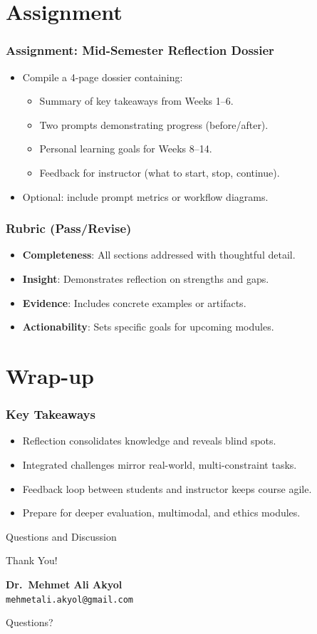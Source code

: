 \documentclass{beamer}
\begin{document}
\section{Assignment}

\begin{frame}
    \frametitle{Assignment: Mid-Semester Reflection Dossier}
    \begin{itemize}
        \item Compile a 4-page dossier containing:
        \begin{itemize}
            \item Summary of key takeaways from Weeks 1--6.
            \item Two prompts demonstrating progress (before/after).
            \item Personal learning goals for Weeks 8--14.
            \item Feedback for instructor (what to start, stop, continue).
        \end{itemize}
        \item Optional: include prompt metrics or workflow diagrams.
    \end{itemize}
\end{frame}

\begin{frame}
    \frametitle{Rubric (Pass/Revise)}
    \begin{itemize}
        \item \textbf{Completeness}: All sections addressed with thoughtful detail.
        \item \textbf{Insight}: Demonstrates reflection on strengths and gaps.
        \item \textbf{Evidence}: Includes concrete examples or artifacts.
        \item \textbf{Actionability}: Sets specific goals for upcoming modules.
    \end{itemize}
\end{frame}

\section{Wrap-up}

\begin{frame}
    \frametitle{Key Takeaways}
    \begin{itemize}
        \item Reflection consolidates knowledge and reveals blind spots.
        \item Integrated challenges mirror real-world, multi-constraint tasks.
        \item Feedback loop between students and instructor keeps course agile.
        \item Prepare for deeper evaluation, multimodal, and ethics modules.
    \end{itemize}
\end{frame}

\begin{frame}{Questions and Discussion}
    \begin{center}
    {\Huge Thank You!}
    \vspace{1cm}

        \textbf{Dr.\ Mehmet Ali Akyol}\\
        \texttt{mehmetali.akyol@gmail.com}
    \vspace{1cm}

    {\large Questions?}
    \end{center}
\end{frame}
\end{document}
